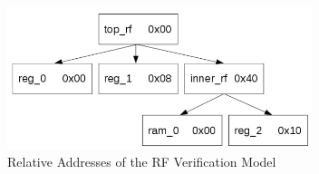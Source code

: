 \begin{figure}[h]
 \centering
 \includegraphics[width=252pt]{images/hierarchy_rf.png}
 \caption{Relative Addresses of the RF Verification Model}
\label{fig::rel_address}
\end{figure}
